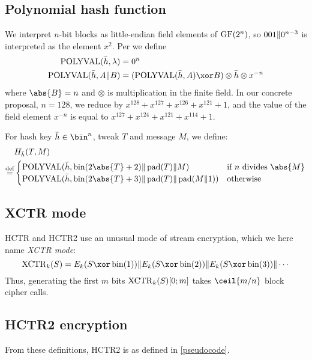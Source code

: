 \documentclass[hctr2.tex]{subfiles}
\begin{document}
\subsection{Polynomial hash function}\label{hashspec}
We interpret \(n\)-bit blocks as little-endian field elements of \(\operatorname{GF}(2^n)\),
so \(001 \Vert 0^{n-3}\) is interpreted as the element \(x^2\).
Per \cite{aes_gcm_siv,aes_gcm_siv_rfc} we define
\begin{align*}
    \POLYVAL(\hgen, \lambda) & = 0^n\\
    \POLYVAL(\hgen, A \Concat B) & = (\POLYVAL(\hgen, A) \xor B) \otimes \hgen \otimes x^{-n}
\end{align*}
where \(\abs{B} = n\) and
\(\otimes\) is multiplication in the finite field.
In our concrete proposal, \(n=128\), we reduce by
\(x^{128} + x^{127} + x^{126} + x^{121} + 1\),
and the value of the field element \(x^{-n}\)
is equal to \(x^{127} + x^{124} + x^{121} + x^{114} + 1\).

For hash key \(\hgen \in \bin^n\), tweak \(T\) and message \(M\), we define:
\begin{align*}
    & H_{\hgen}(T, M) \\
    \defeq & 
    \begin{cases}
        \POLYVAL(\hgen, \fromint(2\abs{T} + 2) \Concat \pad(T) \Concat M) &
        \text{if } n \text{ divides } \abs{M} \\
        \POLYVAL(\hgen, \fromint(2\abs{T} + 3) \Concat \pad(T) \Concat \pad(M \Concat 1)) &
        \text{otherwise}
    \end{cases}
\end{align*}

\subsection{XCTR mode}
HCTR and HCTR2 use an unusual mode of stream encryption,
which we here name \emph{XCTR mode}:
\begin{displaymath}
    \XCTR_k(S) = E_k(S \xor \fromint(1)) \Concat E_k(S \xor \fromint(2)) \Concat E_k(S \xor \fromint(3)) \Concat \cdots
\end{displaymath}
Thus, generating the first \(m\) bits \(\operatorname{XCTR}_k(S)[0; m]\) takes \(\ceil{m/n}\) block cipher calls. 

\subsection{HCTR2 encryption}
From these definitions, HCTR2 is as defined in \autoref{pseudocode}.

\end{document}
